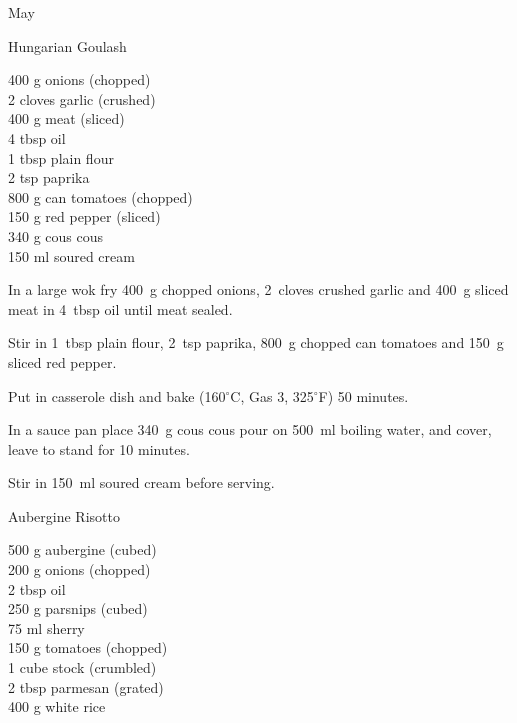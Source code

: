 \begin{menu}{May}
    \begin{recipe}{2}{Hungarian Goulash}%
		\begin{ingredients}
		400 g onions (chopped) \\
	2 cloves garlic (crushed) \\
	400 g meat (sliced) \\
	4 tbsp oil  \\
	1 tbsp plain flour  \\
	2 tsp paprika  \\
	800 g can tomatoes (chopped) \\
	150 g red pepper (sliced) \\
	340 g cous cous  \\
	150 ml soured cream  \\
	
		\end{ingredients}
	
	
    \begin{instructions}
    \item 
        In a large wok fry
        400~g chopped onions,
        2~cloves crushed garlic
        and
        400~g sliced meat
        in
        4~tbsp  oil
        until meat sealed.
      \item 
        Stir in
        1~tbsp  plain flour,
        2~tsp  paprika,
        800~g chopped can tomatoes
        and
        150~g sliced red pepper.
      \item 
        Put in casserole dish and bake (160$^{\circ}$C, Gas 3, 325$^{\circ}$F) 50 minutes.
      \item 
    In a
    sauce pan 
    place
    340~g  cous cous
    pour on
    500~ml  boiling water,
    and cover, leave to stand for 10 minutes.
  \item 
        Stir in
        150~ml  soured cream before serving.
      
    \end{instructions}
    \end{recipe}%
  
    \begin{recipe}{2}{Aubergine Risotto}%
		\begin{ingredients}
		500 g aubergine (cubed) \\
	200 g onions (chopped) \\
	2 tbsp oil  \\
	250 g parsnips (cubed) \\
	75 ml sherry  \\
	150 g tomatoes (chopped) \\
	1 cube stock (crumbled) \\
	2 tbsp parmesan (grated) \\
	400 g white rice  \\
	

\end{ingredients}
\end{recipe}
\end{menu}
